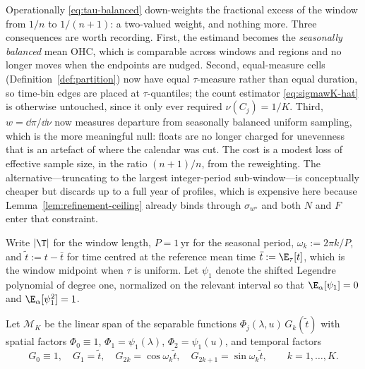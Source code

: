 \begin{remark}
\label{rem:tau-cost}
Operationally \eqref{eq:tau-balanced} down-weights the fractional excess
of the window from $1/n$ to $1/(n+1)$: a two-valued weight, and nothing
more. Three consequences are worth recording. First, the estimand becomes
the \emph{seasonally balanced} mean OHC, which is comparable across
windows and regions and no longer moves when the endpoints are nudged.
Second, equal-measure cells (Definition~\ref{def:partition}) now have
equal $\tau$-measure rather than equal duration, so time-bin edges are
placed at $\tau$-quantiles; the count estimator \eqref{eq:sigmawK-hat} is
otherwise untouched, since it only ever required $\nu(C_j)=1/K$. Third,
$w=\dd\pi/\dd\nu$ now measures departure from seasonally balanced uniform
sampling, which is the more meaningful null: floats are no longer charged
for unevenness that is an artefact of where the calendar was cut. The
cost is a modest loss of effective sample size, in the ratio $(n+1)/n$,
from the reweighting. The alternative---truncating to the largest
integer-period sub-window---is conceptually cheaper but discards up to a
full year of profiles, which is expensive here because
Lemma~\ref{lem:refinement-ceiling} already binds through
$\sigma_{w^{\star}}$ and both $N$ and $F$ enter that constraint.
\end{remark}

Write $|\T|$ for the window length, $P=1\,\mathrm{yr}$ for the seasonal
period, $\omega_k:=2\pi k/P$, and $\tilde t:=t-\bar t$ for time centred
at the reference mean time $\bar t:=\E_\tau[t]$, which is the window
midpoint when $\tau$ is uniform. Let $\psi_1$ denote the
shifted Legendre polynomial of degree one, normalized on the relevant
interval so that $\E_\alpha[\psi_1]=0$ and $\E_\alpha[\psi_1^2]=1$.

\begin{definition}
\label{def:harmonic}
Let $\mathcal M_K$ be the linear span of the separable functions
$\Phi_j(\lambda,u)\,G_k(\tilde t)$ with spatial factors
$\Phi_0\equiv1$, $\Phi_1=\psi_1(\lambda)$, $\Phi_2=\psi_1(u)$, and
temporal factors
\[
  G_0\equiv1,\quad G_1=\tilde t,\quad
  G_{2k}=\cos\omega_k\tilde t,\quad
  G_{2k+1}=\sin\omega_k\tilde t,\qquad k=1,\dots,K .
\]
\end{definition}

